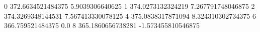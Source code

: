 0 372.6634521484375 5.9039306640625
1 374.0273132324219 7.267791748046875
2 374.3269348144531 7.567413330078125
4 375.0838317871094 8.324310302734375
6 366.759521484375 0.0
8 365.1860656738281 -1.573455810546875
